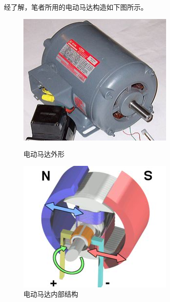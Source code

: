 \documentclass{CLGPY}
\begin{document}
\begin{multicols}{1}
经了解，笔者所用的电动马达构造如下图所示。
        \begin{figure}[H]
            \centering
            \begin{minipage}{.47\linewidth}
                \centering
                \includegraphics[width=\linewidth]{./fig/20210617221233.png}
                \caption{电动马达外形\label{fig:Laton}}
            \end{minipage}
            \quad
            \begin{minipage}{.47\linewidth}
                \centering
                \includegraphics[width=\linewidth]{./fig/20210617221330.png}
                \caption{电动马达内部结构\label{fig:99}}
            \end{minipage}
        \end{figure}


\end{multicols}
\end{document}
